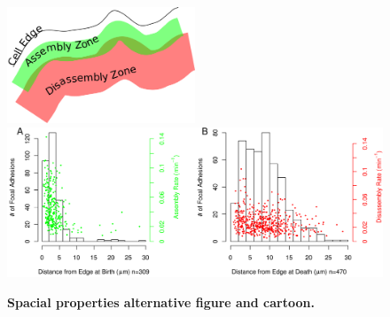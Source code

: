 \begin{figure}[htbp]
\begin{center}
\includegraphics[width=0.5\textwidth]{../figures/spatial/cartoon}
\includegraphics[width=\textwidth]{../figures/spatial/spatial_alt}
\end{center}
\caption{
{\bf Spacial properties alternative figure and cartoon.}
}
\label{spatial_alt}
\end{figure}

